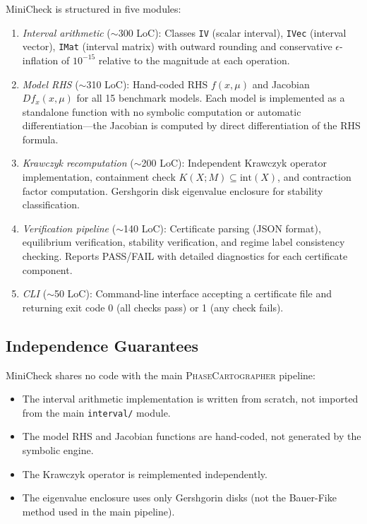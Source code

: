 \documentclass[11pt]{article}
\newcommand{\PC}{\textsc{PhaseCartographer}}
\begin{document}
MiniCheck is structured in five modules:

\begin{enumerate}
\item \emph{Interval arithmetic} ($\sim$300 LoC): Classes \texttt{IV} (scalar interval), \texttt{IVec} (interval vector), \texttt{IMat} (interval matrix) with outward rounding and conservative $\epsilon$-inflation of $10^{-15}$ relative to the magnitude at each operation.

\item \emph{Model RHS} ($\sim$310 LoC): Hand-coded RHS $f(x, \mu)$ and Jacobian $Df_x(x, \mu)$ for all 15 benchmark models.
Each model is implemented as a standalone function with no symbolic computation or automatic differentiation---the Jacobian is computed by direct differentiation of the RHS formula.

\item \emph{Krawczyk recomputation} ($\sim$200 LoC): Independent Krawczyk operator implementation, containment check $K(X; M) \subseteq \mathrm{int}(X)$, and contraction factor computation.
Gershgorin disk eigenvalue enclosure for stability classification.

\item \emph{Verification pipeline} ($\sim$140 LoC): Certificate parsing (JSON format), equilibrium verification, stability verification, and regime label consistency checking.
Reports PASS/FAIL with detailed diagnostics for each certificate component.

\item \emph{CLI} ($\sim$50 LoC): Command-line interface accepting a certificate file and returning exit code 0 (all checks pass) or 1 (any check fails).
\end{enumerate}

\subsection{Independence Guarantees}

MiniCheck shares no code with the main \PC{} pipeline:
\begin{itemize}
\item The interval arithmetic implementation is written from scratch, not imported from the main \texttt{interval/} module.
\item The model RHS and Jacobian functions are hand-coded, not generated by the symbolic engine.
\item The Krawczyk operator is reimplemented independently.
\item The eigenvalue enclosure uses only Gershgorin disks (not the Bauer-Fike method used in the main pipeline).
\end{itemize}
\end{document}
